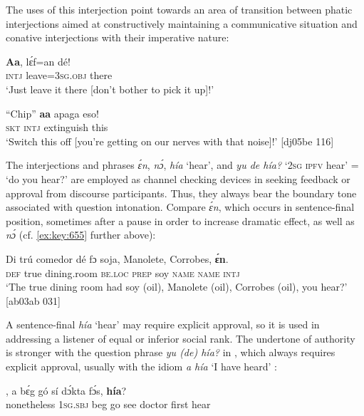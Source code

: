 The uses of this interjection point towards an area of transition between phatic interjections aimed at constructively maintaining a communicative situation and conative interjections with their imperative nature: 



\ea%
    \label{ex:key:1655}
    \gll \textbf{Aa},  lɛ́f=an    dé!\\
\textsc{intj}  leave=\textsc{3sg.obj}  there\\

\glt ‘Just leave it there [don’t bother to pick it up]!’ 
\z


\ea%
    \label{ex:key:1656}
    \gll “Chip”  \textbf{aa}  apaga    eso!\\
\phantom{“}\textsc{skt}    \textsc{intj}  extinguish  this\\

\glt ‘Switch this off [you’re getting on our nerves with that noise]!’ [dj05be 116]
\z

The interjections and phrases \textit{ɛ́n}, \textit{nɔ́}, \textit{hía} ‘hear’, and \textit{yu de hía?} ‘\textsc{2sg ipfv} hear’ = ‘do you hear?’ are employed as channel checking devices in seeking feedback or approval from discourse participants. Thus, they always bear the boundary tone associated with question intonation. Compare \textit{ɛ́n}, which occurs in sentence-final position, sometimes after a pause in order to increase dramatic effect, as well as \textit{nɔ́} (cf. \ref{ex:key:655} further above): 


\ea%
    \label{ex:key:1657}
    \gll Di  trú  comedor    dé    fɔ  soja,    Manolete,
Corrobes,  \textbf{ɛ́n}.\\
\textsc{def}  true  dining.room  \textsc{be.loc}  \textsc{prep}  soy    \textsc{name}
\textsc{name}    \textsc{intj}\\
\glt ‘The true dining room had soy (oil), Manolete (oil), 
Corrobes (oil), you hear?’ [ab03ab 031]
\z

A sentence-final \textit{hía} ‘hear’ may require explicit approval, so it is used in addressing a listener of equal or inferior social rank. The undertone of authority is stronger with the question phrase \textit{yu (de) hía?} in , which always requires explicit approval, usually with the idiom \textit{a hía} ‘I have heard’ : 


\ea%
    \label{ex:key:1658}
    ,  a    bɛ́g  gó  sí  dɔ́kta  fɔ́s,  \textbf{hía}?\\
nonetheless    \textsc{1sg.sbj}  beg  go  see  doctor  first  hear\\

